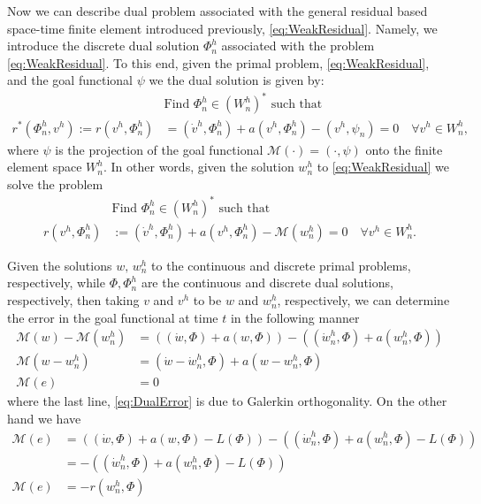 Now we can describe dual problem associated with the general residual based
space-time finite element introduced previously, \eqref{eq:WeakResidual}.
Namely, we introduce the discrete dual solution $\Phi^h_n$ associated with the
problem \eqref{eq:WeakResidual}. To this end, given the primal problem,
\eqref{eq:WeakResidual}, and the goal functional $\psi$ we the dual solution is
given by:
\begin{equation*}
    \begin{split}
        &\text{Find } \Phi^h_n \in (W^h_n)^* \text{ such that} \\
        r^*(\Phi^h_n, v^h) := r(v^h, \Phi^h_n) &= (\dot{v}^h, \Phi^h_n)
            + a(v^h, \Phi^h_n) - (v^h, \psi_n) = 0 \quad
            \forall v^h \in W^h_n,
    \end{split}
\end{equation*}
where $\psi$ is the projection of the goal functional $\mathcal{M}(\cdot) =
(\cdot, \psi)$ onto the finite element space $W^h_n$. In other words, given the
solution $w^h_n$ to \eqref{eq:WeakResidual} we solve the problem
\begin{equation}
    \begin{split}
        &\text{Find } \Phi^h_n \in (W^h_n)^* \text{ such that} \\
        r(v^h, \Phi^h_n) &:= (\dot{v}^h, \Phi^h_n)
            + a(v^h, \Phi^h_n) - \mathcal{M}(w^h_n) = 0 \quad \forall v^h \in W^h_n.
    \end{split}
    \label{eq:Dual}
\end{equation}

Given the solutions $w,\, w^h_n$ to the continuous and discrete primal problems,
respectively, while $\Phi, \Phi^h_n$ are the continuous and discrete dual
solutions, respectively, then taking $v$ and $v^h$ to be $w$ and $w^h_n$,
respectively, we can determine the error in the goal functional at time $t$ in
the following manner
\begin{align}
    \mathcal{M}(w) - \mathcal{M}(w^h_n) &= \left((\dot{w}, \Phi) + a(w, \Phi)\right)
                      - \left( (\dot{w}^h_n, \Phi) + a(w^h_n, \Phi) \right) \nonumber \\
    \mathcal{M}(w - w^h_n) &= (\dot{w} - \dot{w}^h_n, \Phi) + a(w - w^h_n, \Phi) \nonumber \\
    \mathcal{M}(e) &= 0 \label{eq:DualError}
\end{align}
where the last line, \eqref{eq:DualError} is due to Galerkin orthogonality. On
the other hand we have
\begin{align}
    \mathcal{M}(e) & = \left((\dot{w}, \Phi) + a(w, \Phi) - L(\Phi)\right)
             - \left((\dot{w}^h_n, \Phi) + a(w^h_n, \Phi) - L(\Phi) \right) \nonumber \\
    &= -\left((\dot{w}^h_n, \Phi) + a(w^h_n, \Phi) - L(\Phi) \right) \nonumber \\
    \mathcal{M}(e) &= -r(w^h_n, \Phi) \label{eq:ErrorRepresentation} \\
\end{align}

